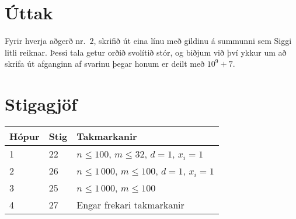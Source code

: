 \section*{Úttak}
Fyrir hverja aðgerð nr.\ $2$, skrifið út eina línu með gildinu á summunni sem
Siggi litli reiknar. Þessi tala getur orðið svolítið stór, og biðjum við því
ykkur um að skrifa út afganginn af svarinu þegar honum er deilt með $10^9+7$.

\section*{Stigagjöf}
\begin{tabular}{|l|l|l|}
\hline
Hópur & Stig & Takmarkanir \\ \hline
1     & 22   & $n \leq 100$, $m \leq 32$, $d = 1$, $x_i = 1$ \\ \hline
2     & 26   & $n \leq 1\,000$, $m \leq 100$, $d = 1$, $x_i = 1$ \\ \hline
3     & 25   & $n \leq 1\,000$, $m \leq 100$ \\ \hline
4     & 27   & Engar frekari takmarkanir\\ \hline
\end{tabular}

